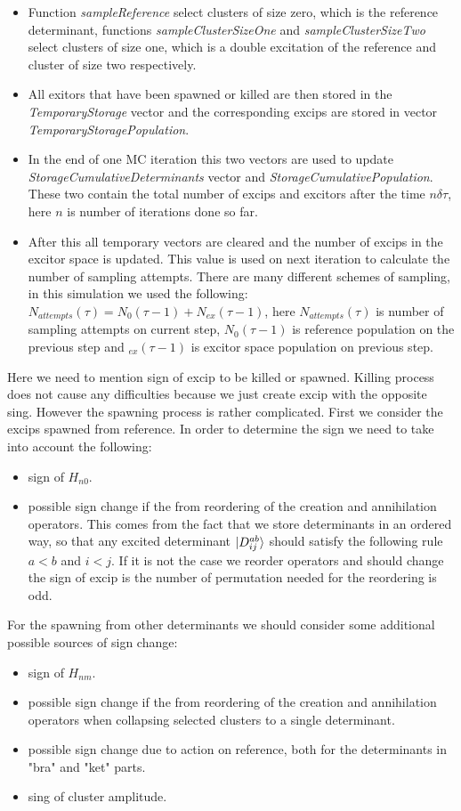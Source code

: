 \documentclass[twoside,english]{uiofysmaster}
\theoremstyle{definition}
\begin{document}
\begin{itemize}
\item Function \textit{sampleReference} select clusters of size zero, which is the reference determinant, functions \textit{sampleClusterSizeOne} and \textit{sampleClusterSizeTwo} select clusters of size one, which is a double excitation of the reference and cluster of size two respectively. 
\item All exitors that have been spawned or killed are then stored in the \textit{TemporaryStorage} vector and the corresponding excips are stored in vector \textit{TemporaryStoragePopulation}.
\item In the end of one MC iteration this two vectors are used to update \textit{StorageCumulativeDeterminants} vector and \textit{StorageCumulativePopulation}. These two contain the total number of excips and excitors after the time $n \delta\tau$, here $n$ is number of iterations done so far. 
\item After this all temporary vectors are cleared and the number of excips in the excitor space is updated. This value is used on next iteration to calculate the number of sampling attempts. There are many different schemes of sampling, in this simulation we used the following: $N_{attempts}(\tau)= N_0(\tau-1)+N_{ex}(\tau-1)$, here $N_{attempts}(\tau)$ is number of sampling attempts on current step, $N_0(\tau-1)$ is reference population on the previous step and $_{ex}(\tau-1)$ is excitor space population on previous step.
\end{itemize}
Here we need to mention sign of excip to be killed or spawned. Killing process does not cause any difficulties because we just create excip with the opposite sing. However the spawning process is rather complicated. First we consider the excips spawned from reference. In order to determine the sign we need to take into account the following:
\begin{itemize}
\item sign of $H_{n0}$.
\item possible sign change if the from reordering of the creation and annihilation operators. This comes from the fact that we store determinants in an ordered way, so that any excited determinant $\ket{D_{ij}^{ab}}$ should satisfy the following rule $a<b$ and $i<j$. If it is not the case we reorder operators and should change the sign of excip is the number of permutation needed for the reordering is odd.
\end{itemize} 
For the spawning from other determinants we should consider some additional possible sources of sign change:
\begin{itemize}
	\item sign of $H_{nm}$.
	\item possible sign change if the from reordering of the creation and annihilation operators when collapsing selected clusters to a single determinant.
	\item possible sign change due to action on reference, both for the determinants in "bra" and "ket" parts.
	\item sing of cluster amplitude.
\end{itemize} 
\end{document}
